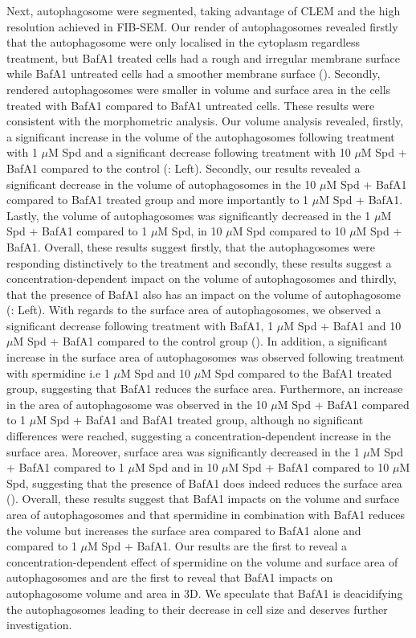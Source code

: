 Next, autophagosome were segmented, taking advantage of CLEM and the high resolution achieved in FIB-SEM. Our render of autophagosomes revealed firstly that the autophagosome were only localised in the cytoplasm regardless treatment, but BafA1 treated cells had a rough and irregular membrane surface while BafA1 untreated cells had a smoother membrane surface (). Secondly, rendered autophagosomes were smaller in volume and surface area in the cells treated with BafA1 compared to BafA1 untreated cells. These results were consistent with the morphometric analysis. Our volume analysis revealed, firstly, a significant increase in the volume of the autophagosomes following treatment with 1 $\mu$M Spd and a significant decrease following treatment with 10 $\mu$M Spd + BafA1 compared to the control (: Left). Secondly, our results revealed a significant decrease in the volume of autophagosomes in the 10 $\mu$M Spd + BafA1 compared to BafA1 treated group and more importantly to 1 $\mu$M Spd + BafA1. Lastly, the volume of autophagosomes was significantly decreased in the 1 $\mu$M Spd + BafA1 compared to 1 $\mu$M Spd, in 10 $\mu$M Spd compared to 10 $\mu$M Spd + BafA1. Overall, these results suggest firstly, that the autophagosomes were responding distinctively to the treatment and secondly, these results suggest a concentration-dependent impact on the volume of autophagosomes and thirdly, that the presence of BafA1 also has an impact on the volume of autophagosome (: Left). With regards to the surface area of autophagosomes, we observed a significant decrease following treatment with BafA1, 1 $\mu$M Spd + BafA1 and 10 $\mu$M Spd + BafA1 compared to the control group (). In addition, a significant increase in the surface area of autophagosomes was observed following treatment with spermidine i.e 1 $\mu$M Spd and 10 $\mu$M Spd compared to the BafA1 treated group, suggesting that BafA1 reduces the surface area. Furthermore, an increase in the area of autophagosome was observed in the 10 $\mu$M Spd + BafA1 compared to 1 $\mu$M Spd + BafA1 and BafA1 treated group, although no significant differences were reached, suggesting a concentration-dependent increase in the surface area. Moreover, surface area was significantly decreased in the 1 $\mu$M Spd + BafA1 compared to 1 $\mu$M Spd and in 10 $\mu$M Spd + BafA1 compared to 10 $\mu$M Spd, suggesting that the presence of BafA1 does indeed reduces the surface area (). Overall, these results suggest that BafA1 impacts on the volume and surface area of autophagosomes and that spermidine in combination with BafA1 reduces the volume but increases the surface area compared to BafA1 alone and compared to 1 $\mu$M Spd + BafA1. Our results are the first to reveal a concentration-dependent effect of spermidine on the volume and surface area of autophagosomes and are the first to reveal that BafA1 impacts on autophagosome volume and area in 3D. We speculate that BafA1 is deacidifying the autophagosomes leading to their decrease in cell size and deserves further investigation.


